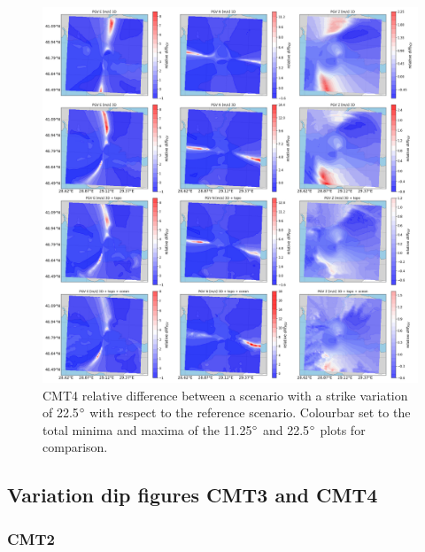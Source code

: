 \documentclass[../Text/00main.tex]{subfiles}
\begin{document}
\begin{figure}[!h]
    \centering
    \includegraphics[width=1\linewidth]{images_results/strike_variation_epsilon25_sc4.png}
    \caption{CMT4 relative difference between a scenario with a strike variation of 22.5$\degree$ with respect to the reference scenario. Colourbar set to the total minima and maxima of the 11.25$\degree$ and 22.5$\degree$ plots for comparison.}
    \label{fig:ref_eps25-2}
\end{figure}

\FloatBarrier

\subsection{Variation dip figures CMT3 and CMT4}

\subsubsection{CMT2}
\end{document}
